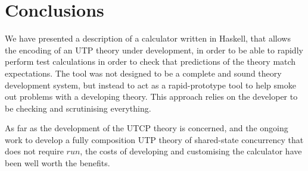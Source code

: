 \section{Conclusions}\label{sec:Conc}

We have presented a description of a calculator written in Haskell,
that allows the encoding of an UTP theory under development,
in order to be able to rapidly perform test calculations
in order to check that predictions of the theory match expectations.
The tool was not designed to be a complete and sound theory development
system,
but instead to act as a rapid-prototype tool to help smoke out problems
with a developing theory. This approach relies on the  developer
to be checking and scrutinising everything.


As far as the development of the UTCP theory is concerned,
and the ongoing work to develop a fully composition UTP theory
of shared-state concurrency that does not require $run$,
the costs of developing and customising the calculator
have been well worth the benefits.

